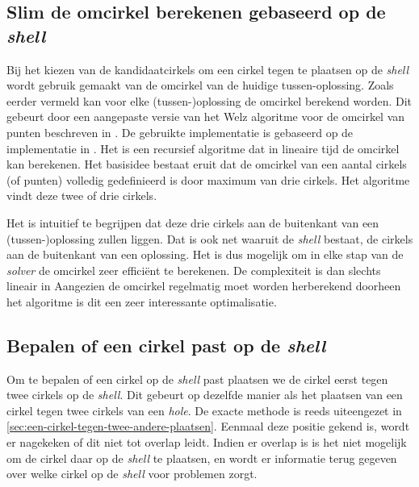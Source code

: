 \documentclass[12pt,a4paper,oneside]{book}
\begin{document}
{\subsection{Slim de omcirkel berekenen gebaseerd op de \textit{shell}}

Bij het kiezen van de kandidaatcirkels om een cirkel tegen te plaatsen op de \textit{shell} wordt gebruik gemaakt van de omcirkel van de huidige tussen-oplossing.
Zoals eerder vermeld kan voor elke (tussen-)oplossing de omcirkel berekend worden.
Dit gebeurt door een aangepaste versie van het Welz algoritme voor de omcirkel van punten beschreven in \cite{welzl1991smallest}.
De gebruikte implementatie is gebaseerd op de implementatie in \cite{sunshine2008welzl}.
Het is een recursief algoritme dat in lineaire tijd de omcirkel kan berekenen.
Het basisidee bestaat eruit dat de omcirkel van een aantal cirkels (of punten) volledig gedefinieerd is door maximum van drie cirkels.
Het algoritme vindt deze twee of drie cirkels.

Het is intuitief te begrijpen dat deze drie cirkels aan de buitenkant van een (tussen-)oplossing zullen liggen.
Dat is ook net waaruit de \textit{shell} bestaat, de cirkels aan de buitenkant van een oplossing.
Het is dus mogelijk om in elke stap van de \textit{solver} de omcirkel zeer efficiënt te berekenen.
De complexiteit is dan slechts lineair in %
Aangezien de omcirkel regelmatig moet worden herberekend  doorheen het algoritme is dit een zeer interessante optimalisatie.

\subsection{Bepalen of een cirkel past op de \textit{shell}} \label{sec:bepalen-of-een-cirkel-past-op-de-shell}

Om te bepalen of een cirkel op de \textit{shell} past plaatsen we de cirkel eerst tegen twee cirkels op de \textit{shell}.
Dit gebeurt op dezelfde manier als het plaatsen van een cirkel tegen twee cirkels van een \textit{hole}.
De exacte methode is reeds uiteengezet in \autoref{sec:een-cirkel-tegen-twee-andere-plaatsen}.
Eenmaal deze positie gekend is, wordt er nagekeken of dit niet tot overlap leidt.
Indien er overlap is is het niet mogelijk om de cirkel daar op de \textit{shell} te plaatsen, en wordt er informatie terug gegeven over welke cirkel op de \textit{shell} voor problemen zorgt.

}
\end{document}
